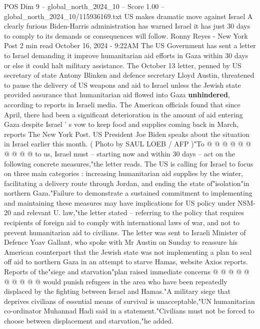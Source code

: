 \begin{textsample}{POS Dim 9 – global\_north\_2024\_10 – Score 1.00 – global\_north\_2024\_10/115936169.txt}  \label{ex:f9_pos_227}
US makes dramatic move against Israel A clearly furious Biden-Harris administration has warned Israel it has just 30 days to comply to its demands or consequences will follow.
Ronny Reyes - New York Post 2 min read October 16, 2024 - 9:22AM The US Government has sent a letter to Israel demanding it improve humanitarian aid efforts in Gaza within 30 days or else it could halt military assistance.
The October 13 letter, penned by US secretary of state Antony Blinken and defence secretary Lloyd Austin, threatened to pause the delivery of US weapons and aid to Israel unless the Jewish state provided assurance that humanitarian aid flowed into Gaza \textbf{unhindered}, according to reports in Israeli media.
The American officials found that since April, there had been a significant deterioration in the amount of aid entering Gaza despite Israel ' s vow to keep food and supplies coming back in March, reports The New York Post.
US President Joe Biden speaks about the situation in Israel earlier this month. ( Photo by SAUL LOEB / AFP )"To @ @ @ @ @ @ @ @ @ @ to us, Israel must -- starting now and within 30 days -- act on the following concrete measures,"the letter reads.
The US is calling for Israel to focus on three main categories : increasing humanitarian aid supplies by the winter, facilitating a delivery route through Jordan, and ending the state of"isolation"in northern Gaza."Failure to demonstrate a sustained commitment to implementing and maintaining these measures may have implications for US policy under NSM-20 and relevant U. law,"the letter stated -- referring to the policy that requires recipients of foreign aid to comply with international laws of war, and not to prevent humanitarian aid to civilians.
The letter was sent to Israeli Minister of Defence Yoav Gallant, who spoke with Mr Austin on Sunday to reassure his American counterpart that the Jewish state was not implementing a plan to seal off aid to northern Gaza in an attempt to starve Hamas, website Axios reports.
Reports of the"siege and starvation"plan raised immediate concerns @ @ @ @ @ @ @ @ @ @ would punish refugees in the area who have been repeatedly displaced by the fighting between Israel and Hamas."A military siege that deprives civilians of essential means of survival is unacceptable,"UN humanitarian co-ordinator Muhannad Hadi said in a statement."Civilians must not be forced to choose between displacement and starvation,"he added.

\end{textsample}
